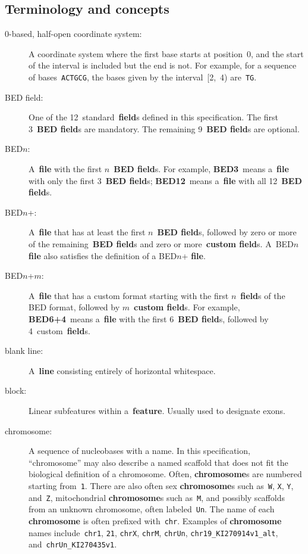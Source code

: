 \documentclass[11pt]{article}
\begin{document}
\subsection{Terminology and concepts}\label{sec:terms}
\begin{description}
\item[0-based, half-open coordinate system:]
  A coordinate system where the first base starts at position~0, and the start of the interval is included but the end is not.
  For example, for a sequence of bases~\texttt{ACTGCG}, the bases given by the interval~[2,~4) are~\texttt{TG}. %

\item[\acs{BED} field:]
  One of the 12~standard~\textbf{field}s defined in this specification.
  The first 3~\textbf{\acs{BED} field}s are mandatory.
  The remaining 9~\textbf{\acs{BED} field}s are optional.

\item[\acs{BED}$n$:]
  A~\textbf{file} with the first $n$~\textbf{\acs{BED} field}s.
  For example, \textbf{BED3}~means a~\textbf{file} with only the first 3~\textbf{\acs{BED} field}s; \textbf{BED12}~means a~\textbf{file} with all 12~\textbf{\acs{BED} field}s.

\item[\acs{BED}$n$+:]
  A~\textbf{file} that has at least the first $n$~\textbf{\acs{BED} field}s, followed by zero or more of the remaining~\textbf{\acs{BED} field}s and zero or more~\textbf{custom field}s.
  A~\acs{BED}$n$ \textbf{file} also satisfies the definition of a \acs{BED}$n$+ \textbf{file}.

\item[\acs{BED}$n$+$m$:]
  A~\textbf{file} that has a custom format starting with the first $n$~\textbf{field}s of the \ac{BED} format, followed by $m$~\textbf{custom field}s.
  For example, \textbf{BED6+4}~means a~\textbf{file} with the first 6~\textbf{\acs{BED} field}s, followed by 4~custom~\textbf{field}s.

\item[blank line:]
  A~\textbf{line} consisting entirely of horizontal whitespace.

\item[block:]
  Linear subfeatures within a~\textbf{feature}.
  Usually used to designate exons.

\item[chromosome:]
  A sequence of nucleobases with a name.
  In this specification, ``chromosome'' may also describe a named scaffold that does not fit the biological definition of a chromosome.
  Often, \textbf{chromosome}s are numbered starting from~\texttt{1}.
  There are also often sex \textbf{chromosome}s such as~\texttt{W}, \texttt{X}, \texttt{Y}, and~\texttt{Z}, mitochondrial \textbf{chromosome}s such as~\texttt{M}, and possibly scaffolds from an unknown chromosome, often labeled~\texttt{Un}.
  The name of each \textbf{chromosome} is often prefixed with~\texttt{chr}.
  Examples of \textbf{chromosome} names include~\texttt{chr1}, \texttt{21}, \texttt{chrX}, \texttt{chrM}, \texttt{chrUn}, \texttt{chr19\_KI270914v1\_alt}, and~\texttt{chrUn\_KI270435v1}.


\end{description}
\end{document}
